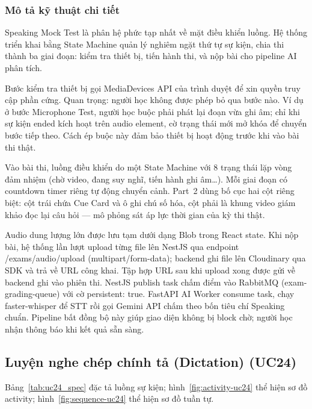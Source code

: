 \subsubsection{Mô tả kỹ thuật chi tiết}

\begin{sloppypar}
Speaking Mock Test là phân hệ phức tạp nhất về mặt điều khiển luồng. Hệ thống triển khai bằng State Machine quản lý nghiêm ngặt thứ tự sự kiện, chia thi thành ba giai đoạn: kiểm tra thiết bị, tiến hành thi, và nộp bài cho pipeline AI phân tích.
\end{sloppypar}

Bước kiểm tra thiết bị gọi MediaDevices API của trình duyệt để xin quyền truy cập phần cứng. Quan trọng: người học không được phép bỏ qua bước nào. Ví dụ ở bước Microphone Test, người học buộc phải phát lại đoạn vừa ghi âm; chỉ khi sự kiện ended kích hoạt trên audio element, cờ trạng thái mới mở khóa để chuyển bước tiếp theo. Cách ép buộc này đảm bảo thiết bị hoạt động trước khi vào bài thi thật.

\begin{sloppypar}
Vào bài thi, luồng điều khiển do một State Machine với 8 trạng thái lặp vòng đảm nhiệm (chờ video, đang suy nghĩ, tiến hành ghi âm\ldots). Mỗi giai đoạn có countdown timer riêng tự động chuyển cảnh. Part~2 dùng bố cục hai cột riêng biệt: cột trái chứa Cue Card và ô ghi chú số hóa, cột phải là khung video giám khảo đọc lại câu hỏi --- mô phỏng sát áp lực thời gian của kỳ thi thật.
\end{sloppypar}

\begin{sloppypar}
Audio dung lượng lớn được lưu tạm dưới dạng Blob trong React state. Khi nộp bài, hệ thống lần lượt upload từng file lên NestJS qua endpoint /exams/audio/upload (multipart/form-data); backend ghi file lên Cloudinary qua SDK và trả về URL công khai. Tập hợp URL sau khi upload xong được gửi về backend ghi vào phiên thi. NestJS publish task chấm điểm vào RabbitMQ (exam-grading-queue) với cờ persistent: true. FastAPI AI Worker consume task, chạy faster-whisper để STT rồi gọi Gemini API chấm theo bốn tiêu chí Speaking chuẩn. Pipeline bất đồng bộ này giúp giao diện không bị block chờ; người học nhận thông báo khi kết quả sẵn sàng.
\end{sloppypar}

\subsection{Luyện nghe chép chính tả (Dictation) (UC24)}
Bảng~\ref{tab:uc24_spec} đặc tả luồng sự kiện; hình~\ref{fig:activity-uc24} thể hiện sơ đồ activity; hình~\ref{fig:sequence-uc24} thể hiện sơ đồ tuần tự.
